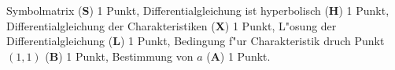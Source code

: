 \begin{bewertung}
Symbolmatrix ({\bf S}) 1 Punkt,
Differentialgleichung ist hyperbolisch ({\bf H}) 1 Punkt,
Differentialgleichung der Charakteristiken ({\bf X}) 1 Punkt,
L"osung der Differentialgleichung ({\bf L}) 1 Punkt,
Bedingung f"ur Charakteristik druch Punkt $(1,1)$ ({\bf B}) 1 Punkt,
Bestimmung von $a$ ({\bf A}) 1 Punkt.
\end{bewertung}
